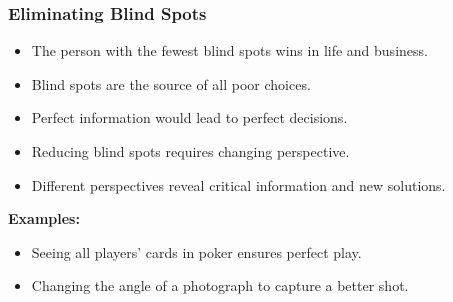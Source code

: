 
\begin{frame}[fragile]\frametitle{Eliminating Blind Spots}
\begin{itemize}
    \item The person with the fewest blind spots wins in life and business.
    \item Blind spots are the source of all poor choices.
    \item Perfect information would lead to perfect decisions.
    \item Reducing blind spots requires changing perspective.
    \item Different perspectives reveal critical information and new solutions.
\end{itemize}
\textbf{Examples:}
\begin{itemize}
    \item Seeing all players' cards in poker ensures perfect play.
    \item Changing the angle of a photograph to capture a better shot.
\end{itemize}
\end{frame}

